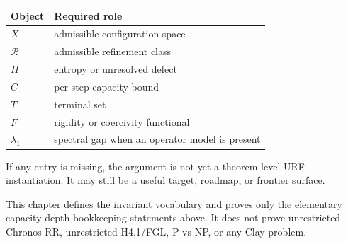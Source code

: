 \begin{center}
\begin{tabular}{ll}
\toprule
Object & Required role \\
\midrule
\(X\) & admissible configuration space \\
\(\mathcal R\) & admissible refinement class \\
\(H\) & entropy or unresolved defect \\
\(C\) & per-step capacity bound \\
\(T\) & terminal set \\
\(F\) & rigidity or coercivity functional \\
\(\lambda_1\) & spectral gap when an operator model is present \\
\bottomrule
\end{tabular}
\end{center}

If any entry is missing, the argument is not yet a theorem-level URF
instantiation. It may still be a useful target, roadmap, or frontier surface.

\begin{remark}[Boundary]
This chapter defines the invariant vocabulary and proves only the elementary
capacity-depth bookkeeping statements above. It does not prove unrestricted
Chronos-RR, unrestricted H4.1/FGL, P vs NP, or any Clay problem.
\end{remark}
